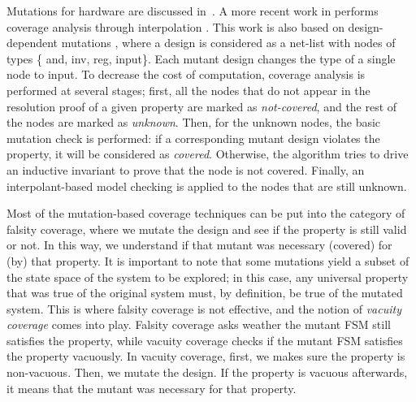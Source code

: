 \newcommand{\andnode}{{\sc and}}
\newcommand{\invnode}{{\sc inv}}
\newcommand{\inpnode}{{\sc inp}}
\newcommand{\regnode}{{\sc reg}}
\newcommand{\mutnode}{{\sc mut}}
\newcommand{\inputnode}{{\sc input}}

Mutations for hardware are discussed in~\cite{chockler2010coverage,Kupferman:2006:SCF,kupferman_theory_2008}. A more recent work in \cite{chockler2010coverage} performs coverage analysis through interpolation \cite{mcmillan2003interpolation}. This work is also based on design-dependent mutations \cite{chockler_coverage_2003}, where a design is considered as a net-list with nodes of types \{ \andnode, \invnode, \regnode, \inputnode \}.
Each mutant design changes the type of a single node to \inputnode .
To decrease the cost of computation, coverage analysis is performed at several stages; first, all the nodes that do not appear in the resolution proof of a given property are marked as \emph{not-covered}, and the rest of the nodes are marked as \emph{unknown}. Then, for the unknown nodes, the basic mutation check is performed: if a corresponding mutant design violates the property, it will be considered as \emph{covered}. Otherwise, the algorithm tries to drive an inductive invariant to prove that the node is not covered. Finally, an interpolant-based model checking is applied to the nodes that are still unknown.

Most of the mutation-based coverage techniques can be put into the category of falsity coverage, where we mutate the design and see if the property is still valid or not.
In this way, we understand if that mutant was necessary (covered) for (by) that property.
It is important to note that some mutations yield a subset of the state space of the system to
be explored; in this case, any universal property that was true of the original system
must, by definition, be true of the mutated system. This is where falsity coverage is not effective, and the notion of \emph{vacuity coverage} comes into play. Falsity coverage asks weather the mutant FSM still satisfies the property, while vacuity coverage checks if the mutant FSM satisfies the property vacuously. In vacuity coverage, first, we makes sure the property is non-vacuous. Then, we mutate the design. If the property is
vacuous afterwards, it means that the mutant was necessary for that property.


